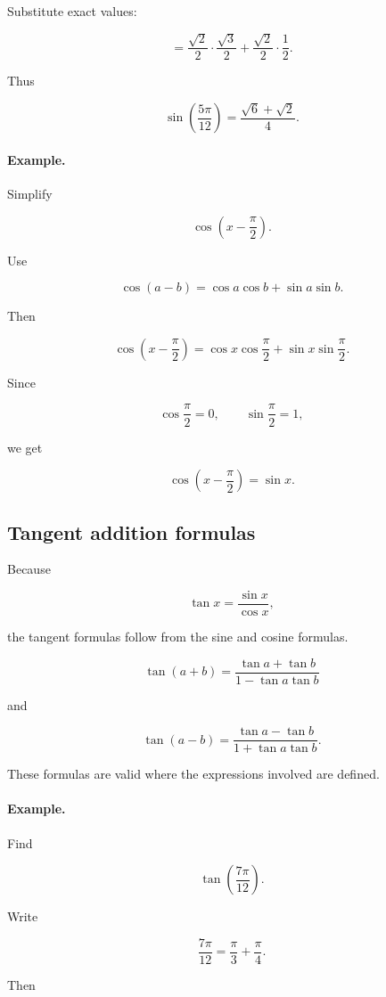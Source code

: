 Substitute exact values:

\[
=
\frac{\sqrt2}{2}\cdot\frac{\sqrt3}{2}
+
\frac{\sqrt2}{2}\cdot\frac12.
\]

Thus

\[
\boxed{
\sin\left(\frac{5\pi}{12}\right)
=
\frac{\sqrt6+\sqrt2}{4}.
}
\]

\paragraph{Example.}
Simplify

\[
\cos\left(x-\frac{\pi}{2}\right).
\]

Use

\[
\cos(a-b)=\cos a\cos b+\sin a\sin b.
\]

Then

\[
\cos\left(x-\frac{\pi}{2}\right)
=
\cos x\cos\frac{\pi}{2}
+
\sin x\sin\frac{\pi}{2}.
\]

Since

\[
\cos\frac{\pi}{2}=0,
\qquad
\sin\frac{\pi}{2}=1,
\]

we get

\[
\boxed{
\cos\left(x-\frac{\pi}{2}\right)=\sin x.
}
\]

\subsection{Tangent addition formulas}
\label{appsubsec:tangent-addition}

Because

\[
\tan x=\frac{\sin x}{\cos x},
\]

the tangent formulas follow from the sine and cosine formulas.

\[
\boxed{
\tan(a+b)=\frac{\tan a+\tan b}{1-\tan a\tan b}
}
\]

and

\[
\boxed{
\tan(a-b)=\frac{\tan a-\tan b}{1+\tan a\tan b}.
}
\]

These formulas are valid where the expressions involved are defined.

\paragraph{Example.}
Find

\[
\tan\left(\frac{7\pi}{12}\right).
\]

Write

\[
\frac{7\pi}{12}
=
\frac{\pi}{3}+\frac{\pi}{4}.
\]

Then

